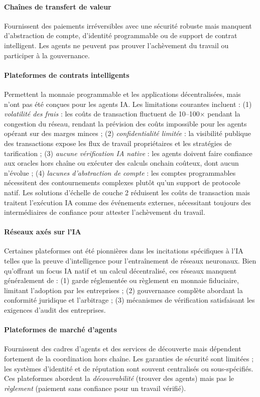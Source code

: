 \documentclass[11pt]{article}
\begin{document}
\paragraph{Chaînes de transfert de valeur} Fournissent des paiements irréversibles avec une sécurité robuste mais manquent d'abstraction de compte, d'identité programmable ou de support de contrat intelligent. Les agents ne peuvent pas prouver l'achèvement du travail ou participer à la gouvernance.

\paragraph{Plateformes de contrats intelligents} Permettent la monnaie programmable et les applications décentralisées, mais n'ont pas été conçues pour les agents IA. Les limitations courantes incluent : (1) \emph{volatilité des frais} : les coûts de transaction fluctuent de 10--100$\times$ pendant la congestion du réseau, rendant la prévision des coûts impossible pour les agents opérant sur des marges minces ; (2) \emph{confidentialité limitée} : la visibilité publique des transactions expose les flux de travail propriétaires et les stratégies de tarification ; (3) \emph{aucune vérification IA native} : les agents doivent faire confiance aux oracles hors chaîne ou exécuter des calculs onchain coûteux, dont aucun n'évolue ; (4) \emph{lacunes d'abstraction de compte} : les comptes programmables nécessitent des contournements complexes plutôt qu'un support de protocole natif. Les solutions d'échelle de couche 2 réduisent les coûts de transaction mais traitent l'exécution IA comme des événements externes, nécessitant toujours des intermédiaires de confiance pour attester l'achèvement du travail.

\paragraph{Réseaux axés sur l'IA} Certaines plateformes ont été pionnières dans les incitations spécifiques à l'IA telles que la preuve d'intelligence pour l'entraînement de réseaux neuronaux. Bien qu'offrant un focus IA natif et un calcul décentralisé, ces réseaux manquent généralement de : (1) garde réglementée ou règlement en monnaie fiduciaire, limitant l'adoption par les entreprises ; (2) gouvernance complète abordant la conformité juridique et l'arbitrage ; (3) mécanismes de vérification satisfaisant les exigences d'audit des entreprises.

\paragraph{Plateformes de marché d'agents} Fournissent des cadres d'agents et des services de découverte mais dépendent fortement de la coordination hors chaîne. Les garanties de sécurité sont limitées ; les systèmes d'identité et de réputation sont souvent centralisés ou sous-spécifiés. Ces plateformes abordent la \emph{découvrabilité} (trouver des agents) mais pas le \emph{règlement} (paiement sans confiance pour un travail vérifié).
\end{document}
